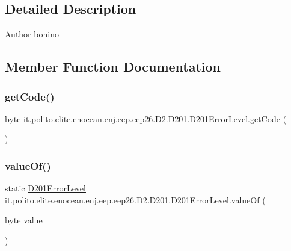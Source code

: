 \subsection{Detailed Description}
\begin{DoxyAuthor}{Author}
bonino 
\end{DoxyAuthor}


\subsection{Member Function Documentation}
\hypertarget{enumit_1_1polito_1_1elite_1_1enocean_1_1enj_1_1eep_1_1eep26_1_1_d2_1_1_d201_1_1_d201_error_level_a43641622ad7d20b71d7538c94daa4bc9}{}\label{enumit_1_1polito_1_1elite_1_1enocean_1_1enj_1_1eep_1_1eep26_1_1_d2_1_1_d201_1_1_d201_error_level_a43641622ad7d20b71d7538c94daa4bc9} 
\subsubsection{\texorpdfstring{get\+Code()}{getCode()}}
{\footnotesize\ttfamily byte it.\+polito.\+elite.\+enocean.\+enj.\+eep.\+eep26.\+D2.\+D201.\+D201\+Error\+Level.\+get\+Code (\begin{DoxyParamCaption}{ }\end{DoxyParamCaption})}

\hypertarget{enumit_1_1polito_1_1elite_1_1enocean_1_1enj_1_1eep_1_1eep26_1_1_d2_1_1_d201_1_1_d201_error_level_af6754b3c2a85186d63f682ba05e0258d}{}\label{enumit_1_1polito_1_1elite_1_1enocean_1_1enj_1_1eep_1_1eep26_1_1_d2_1_1_d201_1_1_d201_error_level_af6754b3c2a85186d63f682ba05e0258d} 
\subsubsection{\texorpdfstring{value\+Of()}{valueOf()}}
{\footnotesize\ttfamily static \hyperlink{enumit_1_1polito_1_1elite_1_1enocean_1_1enj_1_1eep_1_1eep26_1_1_d2_1_1_d201_1_1_d201_error_level}{D201\+Error\+Level} it.\+polito.\+elite.\+enocean.\+enj.\+eep.\+eep26.\+D2.\+D201.\+D201\+Error\+Level.\+value\+Of (\begin{DoxyParamCaption}\item[{byte}]{value }\end{DoxyParamCaption})\hspace{0.3cm}{\ttfamily [static]}}



